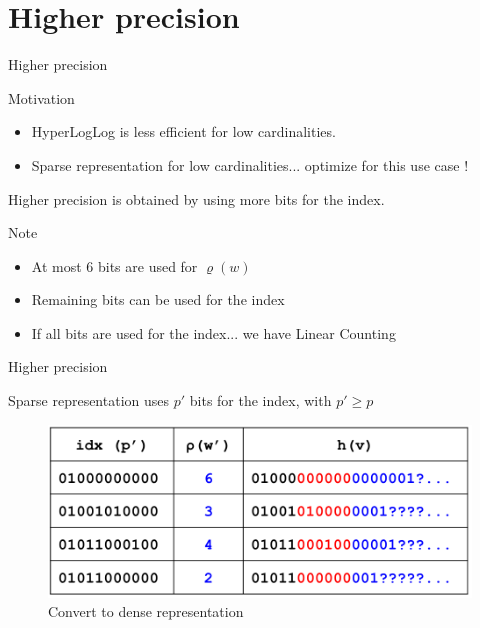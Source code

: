 \documentclass{beamer}
\begin{document}
\section{Higher precision}
\begin{frame}{Higher precision}

  \begin{block}{Motivation}
    \begin{itemize}
      \item HyperLogLog is less efficient for low cardinalities. 
      \item Sparse representation for low cardinalities... optimize for this use case !
    \end{itemize}
  \end{block}

  Higher precision is obtained by using more bits for the index. 

  \begin{block}{Note}
    \begin{itemize} 
      \item At most 6 bits are used for $\varrho(w)$
      \item Remaining bits can be used for the index
      \item If all bits are used for the index... we have Linear Counting
    \end{itemize}
  \end{block}

\end{frame}



\begin{frame}{Higher precision}

  Sparse representation uses $p \prime$ bits for the index, with $p \prime \ge p$

  \begin{figure}[c]
    \includegraphics[scale=0.45]{hyperloglog_prime_to_p.png}
    \caption{Convert to dense representation}
  \end{figure}

\end{frame}
\end{document}
